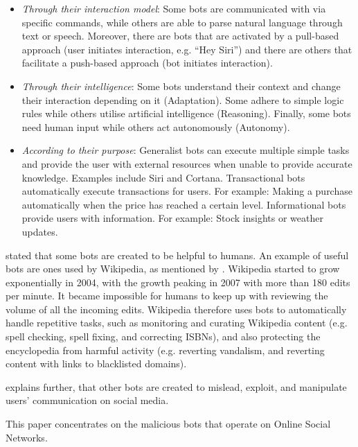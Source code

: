             \begin{itemize}
            	\item \textit{Through their interaction model}: Some bots are communicated with via specific commands, while others are able to parse natural language through text or speech. Moreover, there are bots that are activated by a pull-based approach (user initiates interaction, e.g. “Hey Siri”) and there are others that facilitate a push-based approach (bot initiates interaction).
        		\item \textit{Through their intelligence}: Some bots understand their context and change their interaction depending on it (Adaptation). Some adhere to simple logic rules while others utilise artificial intelligence (Reasoning). Finally, some bots need human input while others act autonomously (Autonomy).
        		\item \textit{According to their purpose}: Generalist bots can execute multiple simple tasks and provide the user with external resources when unable to provide accurate knowledge. Examples include Siri and Cortana. Transactional bots automatically execute transactions for users. For example: Making a purchase automatically when the price has reached a certain level. Informational bots provide users with information. For example: Stock insights or weather updates.
            \end{itemize}
            
              \textcite[96]{RiseOfSocialBots} stated that some bots are created to be helpful to humans. 
        An example of useful bots are ones used by Wikipedia, as mentioned by \textcite[79-80]{Wikipedia}. Wikipedia started to grow exponentially in 2004, with the growth peaking in 2007 with more than 180 edits per minute. It became impossible for humans to keep up with reviewing the volume of all the incoming edits. Wikipedia therefore uses bots to automatically handle repetitive tasks, such as monitoring and curating Wikipedia content (e.g. spell checking, spell fixing, and correcting ISBNs), and also protecting the encyclopedia from harmful activity (e.g. reverting vandalism, and reverting content with links to blacklisted domains).
        
        \textcite[98]{RiseOfSocialBots} explains further, that other bots are created to mislead, exploit, and manipulate users’ communication on social media. 
        
        This paper concentrates on the malicious bots that operate on Online Social Networks.
    
